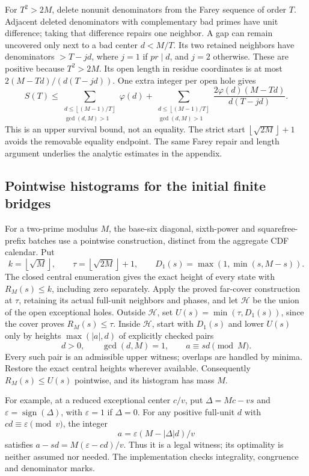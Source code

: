 \documentclass[11pt]{article}
\theoremstyle{definition}\newtheorem{definition}[theorem]{Definition}
\theoremstyle{remark}\newtheorem{remark}[theorem]{Remark}
\newcommand{\floor}[1]{\left\lfloor #1\right\rfloor}
\begin{document}
For \(T^2>2M\), delete nonunit denominators from the Farey sequence of
order \(T\). Adjacent deleted denominators with complementary bad primes
have unit difference; taking that difference repairs one neighbor.
A gap can remain uncovered only next to a bad center \(d<M/T\).
Its two retained neighbors have denominators \(>T-jd\), where \(j=1\)
if \(pr\mid d\), and \(j=2\) otherwise. These are positive because
\(T^2>2M\). Its open length in residue coordinates is at most
\(2(M-Td)/(d(T-jd))\). One extra integer per open hole gives
\[
 S(T)\le
 \sum_{\substack{d\le\floor{(M-1)/T}\\\gcd(d,M)>1}}\varphi(d)
 +\sum_{\substack{d\le\floor{(M-1)/T}\\\gcd(d,M)>1}}
       \frac{2\varphi(d)(M-Td)}{d(T-jd)}.           \tag{3.6}\label{eq:far}
\]
This is an upper survival bound, not an equality.
The strict start \(\floor{\sqrt{2M}}+1\) avoids the removable
equality endpoint. The same Farey repair and length argument underlies
the analytic estimates in the appendix.


\subsection{Pointwise histograms for the initial finite bridges}
\label{sec:early-histograms}
For a two-prime modulus \(M\), the base-six diagonal, sixth-power and
squarefree-prefix batches use a pointwise construction, distinct from
the aggregate CDF calendar. Put
\[
 k=\floor{\sqrt M},\qquad \tau=\floor{\sqrt{2M}}+1,\qquad
 D_1(s)=\max(1,\min(s,M-s)).
\]
The closed central enumeration gives the exact height of every state
with \(R_M(s)\le k\), including zero separately.
Apply the proved far-cover construction at \(\tau\), retaining its
actual full-unit neighbors and phases, and let \(\mathcal H\) be the
union of the open exceptional holes.
Outside \(\mathcal H\), set \(U(s)=\min(\tau,D_1(s))\), since the cover
proves \(R_M(s)\le\tau\).
Inside \(\mathcal H\), start with \(D_1(s)\) and lower \(U(s)\) only
by heights \(\max(|a|,d)\) of explicitly checked pairs
\[
 d>0,\qquad \gcd(d,M)=1,\qquad a\equiv sd\pmod M.
\]
Every such pair is an admissible upper witness; overlaps are handled
by minima. Restore the exact central heights wherever available.
Consequently \(R_M(s)\le U(s)\) pointwise, and its histogram has mass \(M\).

For example, at a reduced exceptional center \(c/v\), put
\(\Delta=Mc-vs\) and \(\varepsilon=\operatorname{sign}(\Delta)\),
with \(\varepsilon=1\) if \(\Delta=0\).
For any positive full-unit \(d\) with \(cd\equiv\varepsilon\pmod v\), the
integer
\[
 a=\varepsilon(M-|\Delta|d)/v
\]
satisfies \(a-sd=M(\varepsilon-cd)/v\).
Thus it is a legal witness; its optimality is neither assumed nor needed.
The implementation checks integrality, congruence and denominator marks.
\end{document}
